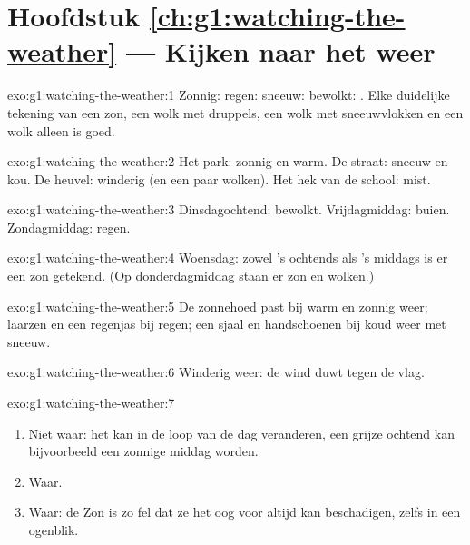 \section*{Hoofdstuk \ref{ch:g1:watching-the-weather} --- Kijken naar het weer}

\begin{solution}{exo:g1:watching-the-weather:1}
Zonnig: \quad regen: \quad sneeuw: \quad
bewolkt: . Elke duidelijke tekening van een zon, een wolk met
druppels, een wolk met sneeuwvlokken en een wolk alleen is goed.
\end{solution}

\begin{solution}{exo:g1:watching-the-weather:2}
Het park: zonnig en warm. De straat: sneeuw en kou. De heuvel: winderig
(en een paar wolken). Het hek van de school: mist.
\end{solution}

\begin{solution}{exo:g1:watching-the-weather:3}
Dinsdagochtend: bewolkt. Vrijdagmiddag: buien. Zondagmiddag: regen.
\end{solution}

\begin{solution}{exo:g1:watching-the-weather:4}
Woensdag: zowel 's ochtends als 's middags is er een zon getekend. (Op
donderdagmiddag staan er zon en wolken.)
\end{solution}

\begin{solution}{exo:g1:watching-the-weather:5}
De zonnehoed past bij warm en zonnig weer; laarzen en een regenjas bij
regen; een sjaal en handschoenen bij koud weer met sneeuw.
\end{solution}

\begin{solution}{exo:g1:watching-the-weather:6}
Winderig weer: de wind duwt tegen de vlag.
\end{solution}

\begin{solution}{exo:g1:watching-the-weather:7}
\begin{enumerate}
  \item Niet waar: het  kan in de loop van de dag veranderen, een
        grijze ochtend kan bijvoorbeeld een zonnige middag worden.
  \item Waar.
  \item Waar: de Zon is zo fel dat ze het oog voor altijd kan beschadigen,
        zelfs in een ogenblik.
\end{enumerate}
\end{solution}

